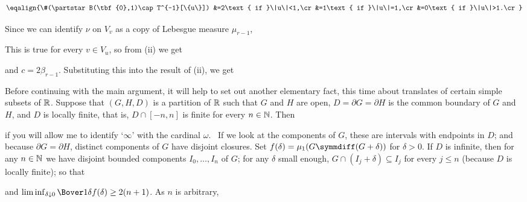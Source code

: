 {$$\eqalign{\#(\partstar B(\tbf{0},1)\cap T^{-1}[\{u\}])
&=2\text{ if }\|u\|<1,\cr
&=1\text{ if }\|u\|=1,\cr
&=0\text{ if }\|u\|>1.\cr}$$

\noindent Since we can identify $\nu$ on $V_v$ as a copy of Lebesgue
measure $\mu_{r-1}$,


\noindent This is true for every $v\in V_u$, so from (ii) we get


\noindent and $c=2\beta_{r-1}$.   Substituting this into the result of
(ii), we get


\medskip

 Before continuing with the main argument, it will help
to set out another elementary fact, this time about
translates of certain
simple subsets of $\Bbb R$.   Suppose that $(G,H,D)$ is a
partition of $\Bbb R$ such that $G$ and $H$ are open,
$D=\partial G=\partial H$ is the common boundary of $G$ and $H$,
and $D$ is locally finite, that is,
$D\cap[-n,n]$ is finite for every $n\in\Bbb N$.   Then


\noindent if you will allow me to identify `$\infty$' with the cardinal
$\omega$.   \Prf\ If we look at the components of $G$, these are intervals
with endpoints in $D$;  and because $\partial G=\partial H$, distinct
components of $G$ have disjoint closures.   Set
$f(\delta)=\mu_1(G\symmdiff(G+\delta))$ for $\delta>0$.   If
$D$ is infinite, then for any $n\in\Bbb N$ we have disjoint
bounded components
$I_0,\ldots,I_n$ of $G$;  for any $\delta$ small enough,
$G\cap(I_j+\delta)\subseteq I_j$ for every $j\le n$ (because $D$ is locally
finite);  so that


\noindent and
$\liminf_{\delta\downarrow 0}\Bover1{\delta}f(\delta)\ge 2(n+1)$.
As $n$ is arbitrary,

}
